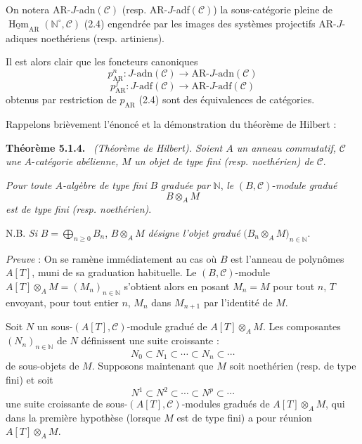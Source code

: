 \documentclass[11pt]{article}
\newenvironment{statement}[1]{\par\medskip\noindent\textbf{#1.}\ }{\par\medskip}
\DeclareMathOperator{\Hom}{Hom}
\providecommand{\uHom}{\underline{\Hom}}
\providecommand{\Hom}{\operatorname{Hom}}
\providecommand{\Hom}{\operatorname{Hom}}
\begin{document}
On notera AR-\(J\)-adn\((\mathcal C)\) (resp. AR-\(J\)-adf\((\mathcal C)\)) la sous-catégorie pleine de \(\uHom_{\mathrm{AR}}(\mathbb N^\circ,\mathcal C)\) (2.4) engendrée par les images des systèmes projectifs AR-\(J\)-adiques noethériens (resp. artiniens).

Il est alors clair que les foncteurs canoniques
\[
p^n_{\mathrm{AR}}:J\text{-adn}(\mathcal C)\longrightarrow \mathrm{AR}\text{-}J\text{-adn}(\mathcal C)
\]
\[
p^f_{\mathrm{AR}}:J\text{-adf}(\mathcal C)\longrightarrow \mathrm{AR}\text{-}J\text{-adf}(\mathcal C)
\]
obtenus par restriction de \(p_{\mathrm{AR}}\) (2.4) sont des équivalences de catégories.

Rappelons brièvement l'énoncé et la démonstration du théorème de Hilbert :

\begin{statement}{Théorème 5.1.4}
\emph{(Théorème de Hilbert). Soient \(A\) un anneau commutatif,} \(\mathcal C\) \emph{une} \(A\)-\emph{catégorie abélienne,} \(M\) \emph{un objet de type fini (resp. noethérien) de} \(\mathcal C\).

\emph{Pour toute \(A\)-algèbre de type fini} \(B\) \emph{graduée par} \(\mathbb N\), \emph{le} \((B,\mathcal C)\)-\emph{module gradué}
\[
B\otimes_A M
\]
\emph{est de type fini} \emph{(resp. noethérien)}.

N.B. \emph{Si} \(B=\bigoplus_{n\ge0}B_n\), \(B\otimes_A M\) \emph{désigne l'objet gradué} \(\bigl(B_n\otimes_A M\bigr)_{n\in\mathbb N}\).
\end{statement}

\emph{Preuve} : On se ramène immédiatement au cas où \(B\) est l'anneau de polynômes \(A[T]\), muni de sa graduation habituelle. Le \((B,\mathcal C)\)-module \(A[T]\otimes_A M=(M_n)_{n\in\mathbb N}\) s'obtient alors en posant \(M_n=M\) pour tout \(n\), \(T\) envoyant, pour tout entier \(n\), \(M_n\) dans \(M_{n+1}\) par l'identité de \(M\).

Soit \(N\) un sous-\((A[T],\mathcal C)\)-module gradué de \(A[T]\otimes_A M\). Les composantes \((N_n)_{n\in\mathbb N}\) de \(N\) définissent une suite croissante :
\[
N_0\subset N_1\subset\cdots\subset N_n\subset\cdots
\]
de
sous-objets de \(M\). Supposons maintenant que \(M\) soit noethérien (resp. de type fini) et soit
\[
N^1\subset N^2\subset\cdots\subset N^p\subset\cdots
\]
une suite croissante de sous-\((A[T],\mathcal C)\)-modules gradués de \(A[T]\otimes_A M\), qui dans la première hypothèse (lorsque \(M\) est de type fini) a pour réunion \(A[T]\otimes_A M\).
\end{document}
